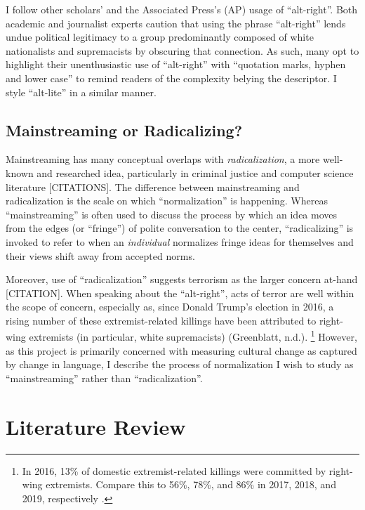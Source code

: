 \documentclass[acmlarge, screen, authorversion]{acmart}
\begin{document}
I follow other scholars’ \cite{hartzellAltWhiteConceptualizingAltRight, massanariRethinkingResearchEthics2018} and the
Associated Press’s (AP) \cite{johndaniszewskiWritingAltright2016} usage of “alt-right”.
Both academic and journalist experts caution that using the
phrase “alt-right” lends undue political legitimacy to a group predominantly
composed of white nationalists and supremacists by obscuring that
connection. As such, many opt to highlight their unenthusiastic use of
“alt-right” with “quotation marks, hyphen and lower case” 
\cite{johndaniszewskiWritingAltright2016} to remind readers of the complexity belying the
descriptor. I style “alt-lite” in a similar manner.

\subsection{Mainstreaming or Radicalizing?}

Mainstreaming has many
conceptual overlaps with \textit{radicalization}, a more well-known and researched idea, particularly in criminal justice and computer science literature [CITATIONS]. The
difference between mainstreaming and radicalization is the scale on
which “normalization” is happening. Whereas
“mainstreaming” is often used to discuss the process by which an idea
moves from the edges (or “fringe”) of polite conversation to the center, “radicalizing” is invoked to refer to when an \textit{individual}
normalizes fringe ideas for themselves and their views shift away from
accepted norms.

Moreover, use of “radicalization” suggests terrorism as the larger
concern at-hand [CITATION]. When speaking about the “alt-right”, acts of
terror are well within the scope of concern, especially as, since Donald
Trump’s election in 2016, a rising number of these extremist-related
killings have been attributed to right-wing extremists (in particular,
white supremacists) (Greenblatt, n.d.). \footnote{In 2016, 13\% of domestic extremist-related
killings were committed by right-wing extremists. Compare this to 56\%,
78\%, and 86\% in 2017, 2018, and 2019, respectively \cite{greenblattRightWingExtremistViolence}.
} However, as this project is primarily concerned with
measuring cultural change as captured by change in language, I describe
the process of normalization I wish to study as “mainstreaming” rather
than “radicalization”.

\section{Literature Review}
\end{document}

